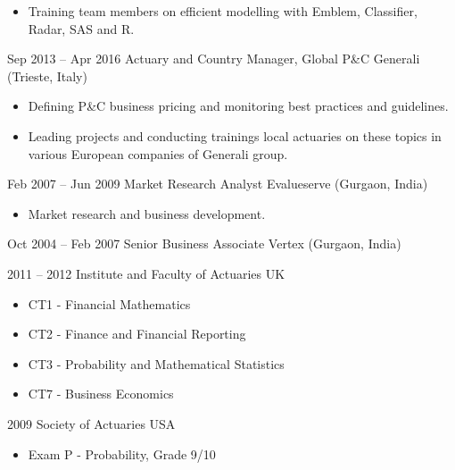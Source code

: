 \documentclass[
	a4paper,
]{fortysecondscv}
\begin{document}
\begin{cvtable}[3]
{\begin{itemize}[nosep, leftmargin=0pt]
					\item Training team members on efficient modelling with Emblem, Classifier, Radar, SAS and R.
				\end{itemize}
			}
		\cvitem
			{Sep 2013 -- Apr 2016}
			{Actuary and Country Manager, Global P\&C}
			{Generali (Trieste, Italy)}
			{
				\vspace{-\topsep}
				\begin{itemize}[nosep, leftmargin=0pt] %
					\item Defining P\&C business pricing and monitoring best practices and guidelines.
					\item Leading projects and conducting trainings local actuaries on these topics in various European companies of Generali group.
				\end{itemize}
			}
		\cvitem
			{Feb 2007 -- Jun 2009}
			{Market Research Analyst}
			{Evalueserve (Gurgaon, India)}
			{
				\vspace{-\topsep}
				\begin{itemize}[nosep, leftmargin=0pt] %
					\item Market research and business development.
				\end{itemize}
			}
		\cvitem
			{Oct 2004 -- Feb 2007}
			{Senior Business Associate}
			{Vertex (Gurgaon, India)}
			{ 
			}
	\end{cvtable}


		\begin{cvtable}[1.5]
			\cvitem
				{2011 -- 2012}
				{Institute and Faculty of Actuaries}
				{UK}
				{
					\vspace{-\topsep}
					\begin{itemize}[nosep, leftmargin=0pt, label={}]
						\item CT1 - Financial Mathematics
						\item CT2 - Finance and Financial Reporting
						\item CT3 - Probability and Mathematical Statistics
						\item CT7 - Business Economics
					\end{itemize}
				}
			\cvitem
				{2009}
				{Society of Actuaries}
				{USA}
				{
					\vspace{-\topsep}
					\begin{itemize}[nosep, leftmargin=0pt, label={}]
						\item Exam P - Probability, Grade 9/10
					\end{itemize}
				}
		\end{cvtable}
\end{document}

